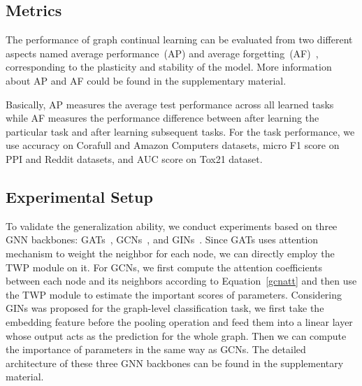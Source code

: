 \documentclass[letterpaper]{article} %
\begin{document}
\subsection{Metrics}
The performance of graph continual learning can be evaluated from
two different aspects named average performance~(AP)
and average forgetting~(AF)~\cite{lopez2017gradient},
corresponding to the {plasticity and stability} of the model.
More information about AP and AF could be found in the supplementary material.

Basically, AP measures the average test performance across all learned tasks
while AF measures the performance difference between after
learning the particular task and after learning subsequent tasks.
For the task performance,
we use accuracy on Corafull and Amazon Computers datasets,
micro F1 score on PPI and Reddit datasets, and
AUC score on Tox21 dataset.



\subsection{Experimental Setup}
To validate the generalization ability,
we conduct experiments based on three GNN backbones:
GATs~\cite{velivckovic2017graph},
GCNs~\cite{kipf2016semi}, and
GINs~\cite{xu2018powerful}.
Since GATs uses attention mechanism to weight the neighbor for each node,
we can directly employ the TWP module on it.
For GCNs, we first compute the attention coefficients between each node
and its neighbors according to Equation~\ref{gcnatt} and
then use the TWP module to estimate the important scores of parameters.
Considering GINs was proposed for the graph-level classification task, we first take the embedding feature before the pooling operation and feed them into a linear layer whose output acts as the
prediction for the whole graph.
Then we can compute the importance of parameters in the same way as GCNs.
The detailed architecture of these three GNN backbones
can be found in the supplementary material.
\end{document}
